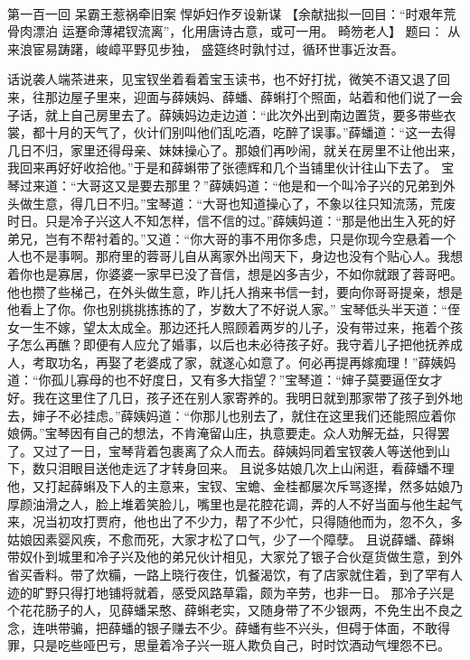 \documentclass[12pt,oneside]{book}
\begin{document}
 
 
第一百一回 呆霸王惹祸牵旧案 悍妒妇作歹设新谋
【余献拙拟一回目：“时艰年荒骨肉漂泊 运蹇命薄裙钗流离”，化用唐诗古意，或可一用。 畸笏老人】
题曰：
从来浪宦易踌躇，峻嶂平野见步独，
盛筵终时孰忖过，循环世事近汝吾。

话说袭人端茶进来，见宝钗坐着看着宝玉读书，也不好打扰，微笑不语又退了回来，往那边屋子里来，迎面与薛姨妈、薛蟠、薛蝌打个照面，站着和他们说了一会子话，就上自己房里去了。薛姨妈边走边道：“此次外出到南边置货，要多带些衣裳，都十月的天气了，伙计们别叫他们乱吃酒，吃醉了误事。”薛蟠道：“这一去得几日不归，家里还得母亲、妹妹操心了。那娘们再吵闹，就关在房里不让他出来，我回来再好好收拾他。”于是和薛蝌带了张德辉和几个当铺里伙计往山下去了。
宝琴过来道：“大哥这又是要去那里？”薛姨妈道：“他是和一个叫冷子兴的兄弟到外头做生意，得几日不归。”宝琴道：“大哥也知道操心了，不象以往只知流荡，荒废时日。只是冷子兴这人不知怎样，信不信的过。”薛姨妈道：“那是他出生入死的好弟兄，岂有不帮衬着的。”又道：“你大哥的事不用你多虑，只是你现今空悬着一个人也不是事啊。那府里的蓉哥儿自从离家外出闯天下，身边也没有个贴心人。我想着你也是寡居，你婆婆一家早已没了音信，想是凶多吉少，不如你就跟了蓉哥吧。他也攒了些梯己，在外头做生意，昨儿托人捎来书信一封，要向你哥哥提亲，想是他看上了你。你也别挑挑拣拣的了，岁数大了不好说人家。”
宝琴低头半天道：“侄女一生不嫁，望太太成全。那边还托人照顾着两岁的儿子，没有带过来，拖着个孩子怎么再醮？即便有人应允了婚事，以后也未必待孩子好。我守着儿子把他抚养成人，考取功名，再娶了老婆成了家，就遂心如意了。何必再提再嫁痴理！”薛姨妈道：“你孤儿寡母的也不好度日，又有多大指望？”宝琴道：“婶子莫要逼侄女才好。我在这里住了几日，孩子还在别人家寄养的。我明日就到那家带了孩子到外地去，婶子不必挂虑。”薛姨妈道：“你那儿也别去了，就住在这里我们还能照应着你娘俩。”宝琴因有自己的想法，不肯淹留山庄，执意要走。众人劝解无益，只得罢了。又过了一日，宝琴背着包裹离了众人而去。薛姨妈同着宝钗袭人等送他到山下，数只泪眼目送他走远了才转身回来。
且说多姑娘几次上山闲逛，看薛蟠不理他，又打起薛蝌及下人的主意来，宝钗、宝蟾、金桂都屡次斥骂逐撵，然多姑娘乃厚颜油滑之人，脸上堆着笑脸儿，嘴里也是花腔花调，弄的人不好当面与他生起气来，况当初攻打贾府，他也出了不少力，帮了不少忙，只得随他而为，忽不久，多姑娘因素婴风疾，不愈而死，大家才松了口气，少了一个障孽。
且说薛蟠、薛蝌带奴仆到城里和冷子兴及他的弟兄伙计相见，大家兑了银子合伙趸货做生意，到外省买香料。带了炊糒，一路上晓行夜住，饥餐渴饮，有了店家就住着，到了罕有人迹的旷野只得打地铺将就着，感受风路草霜，颇为辛劳，也非一日。
那冷子兴是个花花肠子的人，见薛蟠呆憨、薛蝌老实，又随身带了不少银两，不免生出不良之念，连哄带骗，把薛蟠的银子赚去不少。薛蟠有些不兴头，但碍于体面，不敢得罪，只是吃些哑巴亏，思量着冷子兴一班人欺负自己，时时饮酒动气埋怨不已。
\end{document}
